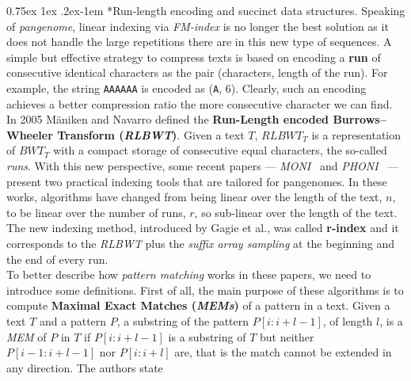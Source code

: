 \documentclass[a4paper,11pt, oneside]{article}
\makeatletter
\newcommand{\pb}[1]{\todo[backgroundcolor=red]{\textbf{PB} #1}}
\newcommand{\dc}[1]{\todo[backgroundcolor=yellow]{\textbf{DC} #1}}
\renewcommand{\paragraph}{%
  \@startsection{paragraph}{4}%
  {\z@}{0.75ex \@plus 1ex \@minus .2ex}{-1em}%
  {\normalfont\normalsize\bfseries}%
}
\makeatother
\begin{document}
\paragraph*{Run-length encoding and succinct data structures.}
\dc{Non so se parlare di LZ}
Speaking of \textit{pangenome}, linear indexing via \textit{FM-index} is no
longer the 
best solution as it does not handle the large repetitions there are in this new
type of sequences. A simple but effective strategy to compress texts is based
on encoding a \textbf{run} of consecutive identical characters as the pair
(characters, length of the run). For example, the string \texttt{AAAAAA} is
encoded as (\texttt{A}, 6). 
Clearly, such an encoding achieves a better compression ratio the more
consecutive character we can find. In 2005 M\"{a}niken and Navarro defined 
the \textbf{Run-Length encoded Burrows–Wheeler Transform
  (\textit{RLBWT})}. Given a text 
$T$, $RLBWT_T$ is a representation of $BWT_T$ with a compact storage of
consecutive equal characters, the so-called \textit{runs}. With this new
perspective, some recent papers --- \textit{MONI}~\cite{moni} and
\textit{PHONI}~\cite{phoni} --- present two practical indexing tools that are
tailored for pangenomes. In these works, algorithms have changed from being
linear over the length of the text, $n$, to be linear over the number of runs,
$r$, so sub-linear over the length of the text.
The new indexing method, introduced by Gagie et al., was called \textbf{r-index} 
and it corresponds to the \textit{RLBWT} plus the \textit{suffix array sampling}
at the beginning and the end of every run. \\
To better describe how \textit{pattern matching} works in these papers, we need
to introduce some definitions. First of all, the main purpose of these
algorithms is to compute \textbf{Maximal Exact Matches (\textit{MEMs})} of a
pattern in a text. Given a text $T$ and a pattern $P$, a substring of the
pattern $P[i : i+l-1]$, of length $l$, is a \textit{MEM} of $P$ in $T$ if
$P[i:i+l-1]$ is a substring of $T$ but neither $P[i-1:i+l-1]$ nor $P[i:i+l]$
are, that is the match cannot be extended in any direction. The authors state
\end{document}
